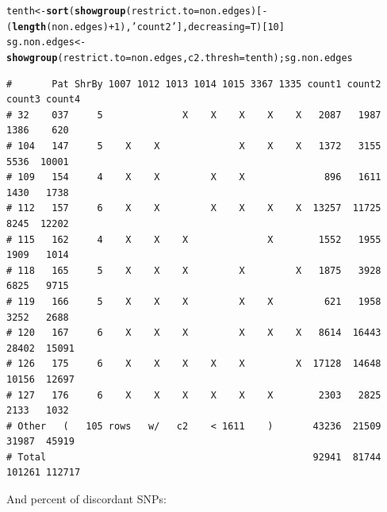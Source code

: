 \documentclass{article}\usepackage[]{graphicx}\usepackage[]{color}
\makeatletter
\newcommand{\hlnum}[1]{\textcolor[rgb]{0.686,0.059,0.569}{#1}}%
\newcommand{\hlstr}[1]{\textcolor[rgb]{0.192,0.494,0.8}{#1}}%
\newcommand{\hlopt}[1]{\textcolor[rgb]{0,0,0}{#1}}%
\newcommand{\hlstd}[1]{\textcolor[rgb]{0.345,0.345,0.345}{#1}}%
\newcommand{\hlkwb}[1]{\textcolor[rgb]{0.69,0.353,0.396}{#1}}%
\newcommand{\hlkwc}[1]{\textcolor[rgb]{0.333,0.667,0.333}{#1}}%
\newcommand{\hlkwd}[1]{\textcolor[rgb]{0.737,0.353,0.396}{\textbf{#1}}}%
\newenvironment{kframe}{%
 \def\at@end@of@kframe{}%
 \ifinner\ifhmode%
  \def\at@end@of@kframe{\end{minipage}}%
  \begin{minipage}{\columnwidth}%
 \fi\fi%
 \def\FrameCommand##1{\hskip\@totalleftmargin \hskip-\fboxsep
 \colorbox{shadecolor}{##1}\hskip-\fboxsep
     \hskip-\linewidth \hskip-\@totalleftmargin \hskip\columnwidth}%
 \MakeFramed {\advance\hsize-\width
   \@totalleftmargin\z@ \linewidth\hsize
   \@setminipage}}%
 {\par\unskip\endMakeFramed%
 \at@end@of@kframe}
\newenvironment{knitrout}{}{} %
\makeatother
\begin{document}
\begin{knitrout}\scriptsize
{}\color{fgcolor}\begin{kframe}
\begin{alltt}
\hlstd{tenth} \hlkwb{<-} \hlkwd{sort}\hlstd{(}\hlkwd{showgroup}\hlstd{(}\hlkwc{restrict.to}\hlstd{=non.edges)[}\hlopt{-}\hlstd{(}\hlkwd{length}\hlstd{(non.edges)}\hlopt{+}\hlnum{1}\hlstd{),}\hlstr{'count2'}\hlstd{],}\hlkwc{decreasing}\hlstd{=T)[}\hlnum{10}\hlstd{]}
\hlstd{sg.non.edges} \hlkwb{<-} \hlkwd{showgroup}\hlstd{(}\hlkwc{restrict.to}\hlstd{=non.edges,} \hlkwc{c2.thresh} \hlstd{= tenth) ; sg.non.edges}
\end{alltt}
\begin{verbatim}
#       Pat ShrBy 1007 1012 1013 1014 1015 3367 1335 count1 count2 count3 count4
# 32    037     5              X    X    X    X    X   2087   1987   1386    620
# 104   147     5    X    X              X    X    X   1372   3155   5536  10001
# 109   154     4    X    X         X    X              896   1611   1430   1738
# 112   157     6    X    X         X    X    X    X  13257  11725   8245  12202
# 115   162     4    X    X    X              X        1552   1955   1909   1014
# 118   165     5    X    X    X         X         X   1875   3928   6825   9715
# 119   166     5    X    X    X         X    X         621   1958   3252   2688
# 120   167     6    X    X    X         X    X    X   8614  16443  28402  15091
# 126   175     6    X    X    X    X    X         X  17128  14648  10156  12697
# 127   176     6    X    X    X    X    X    X        2303   2825   2133   1032
# Other   (   105 rows   w/   c2    < 1611    )       43236  21509  31987  45919
# Total                                               92941  81744 101261 112717
\end{verbatim}
\end{kframe}
\end{knitrout}

And percent of discordant SNPs:
\end{document}
